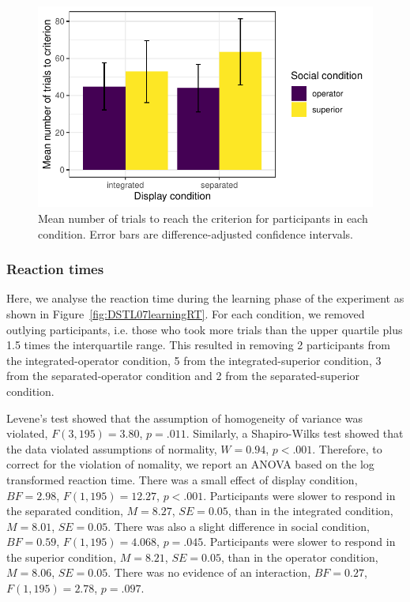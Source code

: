 \documentclass[doc, a4paper, apacite]{apa6}
\begin{document}
\begin{figure}
	\centering
	\includegraphics{images/DSTL07trialsCriterion}
	\caption{Mean number of trials to reach the criterion for participants in each condition. Error bars are difference-adjusted confidence intervals.}
	\label{fig:DSTL07trialsCriterion}
\end{figure}


\subsubsection{Reaction times}
Here, we analyse the reaction time during the learning phase of the experiment as shown in Figure~\ref{fig:DSTL07learningRT}. 
For each condition, we removed outlying participants, i.e. those who took more trials than the upper quartile plus 1.5 times the interquartile range. 
This resulted in removing 2 participants from the integrated-operator condition, 5 from the integrated-superior condition, 3 from the separated-operator condition and 2 from the separated-superior condition. 

Levene's test showed that the assumption of homogeneity of variance was violated, $F(3, 195)=3.80$, $p=.011$. 
Similarly, a Shapiro-Wilks test showed that the data violated assumptions of normality, $W=0.94$, $p<.001$. 
Therefore, to correct for the violation of nomality, we report an ANOVA based on the log transformed reaction time. 
There was a small effect of display condition, $BF=2.98$, $F(1, 195)=12.27$, $p<.001$.
Participants were slower to respond in the separated condition, $M=8.27$, $SE=0.05$, than in the integrated condition, $M=8.01$, $SE=0.05$. 
There was also a slight difference in social condition, $BF=0.59$, $F(1, 195)=4.068$, $p=.045$. 
Participants were slower to respond in the superior condition, $M=8.21$, $SE=0.05$, than in the operator condition, $M=8.06$, $SE=0.05$. 
There was no evidence of an interaction, $BF=0.27$, $F(1, 195)=2.78$, $p=.097$. 
\end{document}
